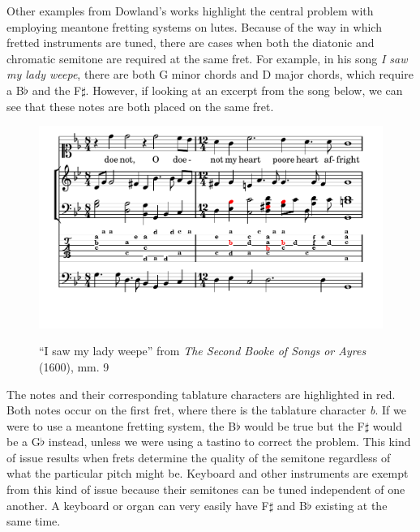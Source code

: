Other examples from Dowland's works highlight the central problem with employing meantone fretting
systems on lutes.  Because of the way in which fretted instruments are tuned, there are cases when
both the diatonic and chromatic semitone are required at the same fret. For example, in his song
\textit{I saw my lady weepe}, there are both G minor chords and D major chords, which require a
B$\flat$ and the F$\sharp$. However, if looking at an excerpt from the song below, we can see that
these notes are both placed on the same fret.
\begin{figure}[h]
\centering
\includegraphics{examples/saw.pdf}
\label{dowland-saw}
\caption{``I saw my lady weepe'' from \textit{The Second Booke of Songs or Ayres} (1600), mm. 9}
\end{figure}
The notes and their corresponding tablature characters are highlighted in red.  Both
notes occur on the first fret, where there is the tablature character \textit{b}.  If
we were to use a meantone fretting system, the B$\flat$ would be true but the F$\sharp$
would be a G$\flat$ instead, unless we were using a tastino to correct the problem.
This kind of issue results when frets determine the quality of the semitone regardless
of what the particular pitch might be.  Keyboard and other instruments are exempt from
this kind of issue because their semitones can be tuned independent of one another.  A
keyboard or organ can very easily have F$\sharp$ and B$\flat$ existing at the same time.

